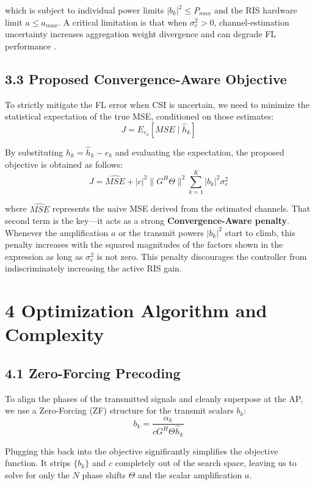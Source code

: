 \documentclass[10pt,twocolumn]{article}
\begin{document}
which is subject to individual power limits $|b_{k}|^{2}\leq P_{max}$ and the RIS hardware limit $a\leq a_{max}$. A critical limitation is that when $\sigma _{e}^{2}>0$, channel-estimation uncertainty increases aggregation weight divergence and can degrade FL performance  \parencite{jiacheng_yao_0a2deb55}.
\subsection{3.3	Proposed Convergence-Aware Objective}

To strictly mitigate the FL error when CSI is uncertain, we need to minimize the statistical expectation of the true MSE, conditioned on those estimates:
\begin{displaymath}
J=E_{e_{k}}[MSE∣\hat{h}_{k}]
\end{displaymath}


By substituting $h_{k}=\hat{h}_{k}-e_{k}$ and evaluating the expectation, the proposed objective is obtained as follows:
\begin{displaymath}
J=\hat{MSE}+|c|^{2}∥G^{H}\Theta ∥^{2}\sum_{k=1}^{K} |b_{k}|^{2}\sigma _{e}^{2}
\end{displaymath}


where $\hat{MSE}$ represents the naive MSE derived from the estimated channels. That second term is the key—it acts as a strong \textbf{Convergence-Aware penalty}. Whenever the amplification $a$ or the transmit powers $|b_{k}|^{2}$ start to climb, this penalty increases with the squared magnitudes of the factors shown in the expression as long as $\sigma _{e}^{2}$ is not zero. This penalty discourages the controller from indiscriminately increasing the active RIS gain.
\section{4	Optimization Algorithm and Complexity}
\subsection{4.1	Zero-Forcing Precoding}

To align the phases of the transmitted signals and cleanly superpose at the AP, we use a Zero-Forcing (ZF) structure for the transmit scalars $b_{k}$:
\begin{displaymath}
b_{k}=\frac{\alpha _{k}}{cG^{H}\Theta \hat{h}_{k}}
\end{displaymath}


Plugging this back into the objective significantly simplifies the objective function. It strips $\{b_{k}\}$ and $c$ completely out of the search space, leaving us to solve for only the $N$ phase shifts $\Theta$ and the scalar amplification $a$.
\end{document}
